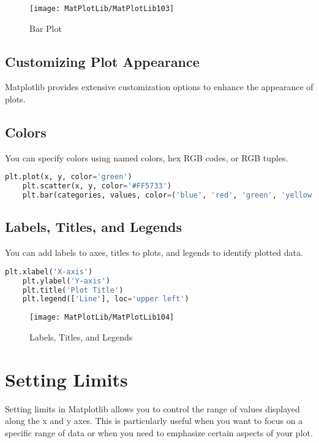 \begin{figure}[h]
	\centering
	\texttt{[image: MatPlotLib/MatPlotLib103]}
	\caption{Bar Plot}\label{Matplotlib03}
\end{figure}

\subsection*{Customizing Plot Appearance}

Matplotlib provides extensive customization options to enhance the appearance of plots.

\subsection*{Colors}
You can specify colors using named colors, hex RGB codes, or RGB tuples.

\begin{lstlisting}[language=Python]
	plt.plot(x, y, color='green')
	plt.scatter(x, y, color='#FF5733')
	plt.bar(categories, values, color=('blue', 'red', 'green', 'yellow'))
\end{lstlisting}

\subsection*{Labels, Titles, and Legends}
You can add labels to axes, titles to plots, and legends to identify plotted data.

\begin{lstlisting}[language=Python]
	plt.xlabel('X-axis')
	plt.ylabel('Y-axis')
	plt.title('Plot Title')
	plt.legend(['Line'], loc='upper left')
\end{lstlisting}

\begin{figure}[h]
	\centering
	\texttt{[image: MatPlotLib/MatPlotLib104]}
	\caption{Labels, Titles, and Legends}\label{Matplotlib04}
\end{figure}


\section*{Setting Limits}

Setting limits in Matplotlib allows you to control the range of values displayed along the x and y axes. This is particularly useful when you want to focus on a specific range of data or when you need to emphasize certain aspects of your plot.

